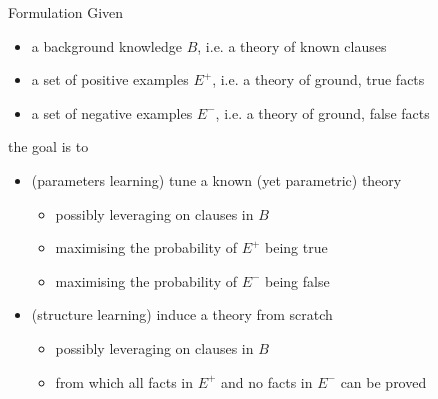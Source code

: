 \documentclass[presentation]{beamer}\mode<presentation>{\usetheme{AMSBolognaFC}}
\begin{document}
\begin{frame}[allowframebreaks]
    \begin{block}{Formulation \cite{DeRaedt2010}}
        Given
        \begin{itemize}
            \item a \alert{background knowledge} $B$, i.e. a theory of known clauses
            \item a set of \alert{positive examples} $E^+$, i.e. a theory of ground, \alert{true} facts
            \item a set of \alert{negative examples} $E^-$, i.e. a theory of ground, \alert{false} facts
        \end{itemize}
        the goal is to 
        \begin{itemize}
            \item \alert{(parameters learning)} tune a \alert{known} (yet \alert{parametric}) theory
            \begin{itemize}
                \item possibly leveraging on clauses in $B$
                \item maximising the probability of $E^+$ being true
                \item maximising the probability of $E^-$ being false
            \end{itemize}
            \item \alert{(structure learning)} induce a theory \alert{from scratch}
            \begin{itemize}
                \item possibly leveraging on clauses in $B$
                \item from which all facts in $E^+$ and no facts in $E^-$ can be proved
            \end{itemize}
        \end{itemize}
    \end{block}
\end{frame}
\end{document}
